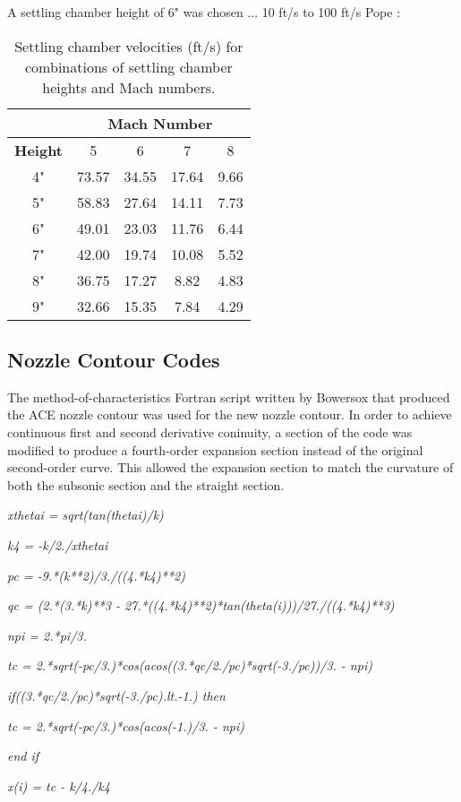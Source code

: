 A settling chamber height of 6" was chosen ... 10 ft/s to 100 ft/s Pope \cite{pope}:

\begin{table}[h]
    \centering
    \label{tab:sc_vel}

    \begin{tabular}{|c|c|c|c|c|}
        \cline{2-5}
        \multicolumn{1}{c}{} & \multicolumn{4}{|c|}{\textbf{Mach Number}} \\ \hline
        \textbf{Height} & 5 & 6 & 7 & 8 \\ \hline
        4" & 73.57 & 34.55 & 17.64 & 9.66 \\ \hline
        5" & 58.83 & 27.64 & 14.11 & 7.73 \\ \hline \hline
        6" & 49.01 & 23.03 & 11.76 & 6.44 \\ \hline \hline
        7" & 42.00 & 19.74 & 10.08 & 5.52 \\ \hline
        8" & 36.75 & 17.27 & 8.82 & 4.83 \\ \hline
        9" & 32.66 & 15.35 & 7.84 & 4.29 \\ \hline
    \end{tabular}
    \caption{Settling chamber velocities (ft/s) for combinations of settling chamber heights and Mach numbers.}
\end{table}
    
\subsection{Nozzle Contour Codes}

The method-of-characteristics Fortran script written by Bowersox that produced the ACE nozzle contour was used for the new nozzle contour. In order to achieve continuous first and second derivative coninuity, a section of the code was modified to produce a fourth-order expansion section instead of the original second-order curve. This allowed the expansion section to match the curvature of both the subsonic section and the straight section.

\begin{singlespace}
    \textit{xthetai = sqrt(tan(thetai)/k)}

    \textit{k4 = -k/2./xthetai} 

    \textit{pc = -9.*(k**2)/3./((4.*k4)**2)} 

    \textit{qc = (2.*(3.*k)**3 - 27.*((4.*k4)**2)*tan(theta(i)))/27./((4.*k4)**3)} 

    \textit{npi = 2.*pi/3.} 

    \textit{tc = 2.*sqrt(-pc/3.)*cos(acos((3.*qc/2./pc)*sqrt(-3./pc))/3. - npi)} 

    \textit{if((3.*qc/2./pc)*sqrt(-3./pc).lt.-1.) then} 

    \textit{tc = 2.*sqrt(-pc/3.)*cos(acos(-1.)/3. - npi)} 

    \textit{end if} 

    \textit{x(i) = tc - k/4./k4} 
\end{singlespace}

